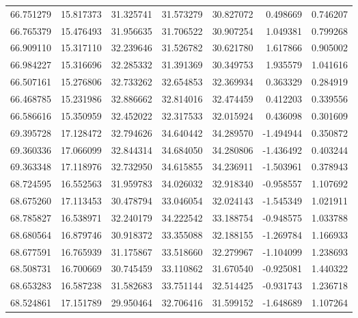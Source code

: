 \begin{tabular}{rrrrrrr}
 66.751279 &  15.817373 &         31.325741 &         31.573279 &         30.827072 &  0.498669 &  0.746207 \\
 66.765379 &  15.476493 &         31.956635 &         31.706522 &         30.907254 &  1.049381 &  0.799268 \\
 66.909110 &  15.317110 &         32.239646 &         31.526782 &         30.621780 &  1.617866 &  0.905002 \\
 66.984227 &  15.316696 &         32.285332 &         31.391369 &         30.349753 &  1.935579 &  1.041616 \\
 66.507161 &  15.276806 &         32.733262 &         32.654853 &         32.369934 &  0.363329 &  0.284919 \\
 66.468785 &  15.231986 &         32.886662 &         32.814016 &         32.474459 &  0.412203 &  0.339556 \\
 66.586616 &  15.350959 &         32.452022 &         32.317533 &         32.015924 &  0.436098 &  0.301609 \\
 69.395728 &  17.128472 &         32.794626 &         34.640442 &         34.289570 & -1.494944 &  0.350872 \\
 69.360336 &  17.066099 &         32.844314 &         34.684050 &         34.280806 & -1.436492 &  0.403244 \\
 69.363348 &  17.118976 &         32.732950 &         34.615855 &         34.236911 & -1.503961 &  0.378943 \\
 68.724595 &  16.552563 &         31.959783 &         34.026032 &         32.918340 & -0.958557 &  1.107692 \\
 68.675260 &  17.113453 &         30.478794 &         33.046054 &         32.024143 & -1.545349 &  1.021911 \\
 68.785827 &  16.538971 &         32.240179 &         34.222542 &         33.188754 & -0.948575 &  1.033788 \\
 68.680564 &  16.879746 &         30.918372 &         33.355088 &         32.188155 & -1.269784 &  1.166933 \\
 68.677591 &  16.765939 &         31.175867 &         33.518660 &         32.279967 & -1.104099 &  1.238693 \\
 68.508731 &  16.700669 &         30.745459 &         33.110862 &         31.670540 & -0.925081 &  1.440322 \\
 68.653283 &  16.587238 &         31.582683 &         33.751144 &         32.514425 & -0.931743 &  1.236718 \\
 68.524861 &  17.151789 &         29.950464 &         32.706416 &         31.599152 & -1.648689 &  1.107264 \\

\end{tabular}
